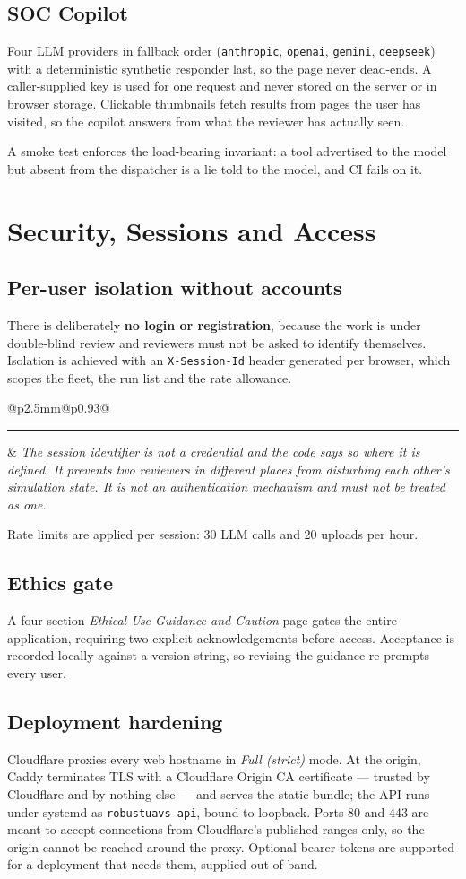 \documentclass[11pt,a4paper]{article}
\makeatletter
\newcommand{\code}[1]{\texttt{#1}}
\newcommand{\provbox}[1]{%
  \par\medskip\noindent
  \begin{tabular}{@{}p{2.5mm}@{\hspace{3mm}}p{0.93\linewidth}@{}}
  \textcolor{bridgecol}{\rule{2.5mm}{\baselineskip}} & \small\itshape #1
  \end{tabular}\par\medskip}
\makeatother
\begin{document}
\subsection{SOC Copilot}
Four LLM providers in fallback order (\code{anthropic}, \code{openai},
\code{gemini}, \code{deepseek}) with a deterministic synthetic responder last, so
the page never dead-ends. A caller-supplied key is used for one request and
never stored on the server or in browser storage. Clickable thumbnails fetch
results from pages the user has visited, so the copilot answers from what the
reviewer has actually seen.

A smoke test enforces the load-bearing invariant: a tool advertised to the model
but absent from the dispatcher is a lie told to the model, and CI fails on it.

\section{Security, Sessions and Access}

\subsection{Per-user isolation without accounts}
There is deliberately \textbf{no login or registration}, because the work is
under double-blind review and reviewers must not be asked to identify
themselves. Isolation is achieved with an \code{X-Session-Id} header generated
per browser, which scopes the fleet, the run list and the rate allowance.

\provbox{The session identifier is \emph{not} a credential and the code says so
where it is defined. It prevents two reviewers in different places from
disturbing each other's simulation state. It is not an authentication mechanism
and must not be treated as one.}

Rate limits are applied per session: 30 LLM calls and 20 uploads per hour.

\subsection{Ethics gate}
A four-section \emph{Ethical Use Guidance and Caution} page gates the entire
application, requiring two explicit acknowledgements before access. Acceptance
is recorded locally against a version string, so revising the guidance
re-prompts every user.

\subsection{Deployment hardening}
Cloudflare proxies every web hostname in \emph{Full (strict)} mode. At the
origin, Caddy terminates TLS with a Cloudflare Origin CA certificate --- trusted
by Cloudflare and by nothing else --- and serves the static bundle; the API runs
under systemd as \code{robustuavs-api}, bound to loopback. Ports 80 and 443 are
meant to accept connections from Cloudflare's published ranges only, so the
origin cannot be reached around the proxy. Optional bearer tokens are supported
for a deployment that needs them, supplied out of band.
\end{document}
